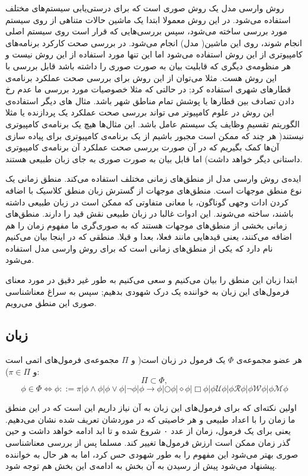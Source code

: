 روش وارسی مدل یک روش صوری است که برای درستی‌یابی سیستم‌های مختلف استفاده می‌شود. در این روش معمولا ابتدا یک ماشین حالات متناهی از روی سیستم مورد بررسی ساخته می‌شود، سپس بررسی‌هایی که قرار است روی سیستم اصلی انجام شوند، روی این ماشین( مدل) انجام می‌شود. در بررسی صحت کارکرد برنامه‌های کامپیوتری از این روش استفاده می‌شود اما این تنها مورد استفاده از این روش نیست و هر منظومه‌ی دیگری که قابلیت بیان به صورت صوری را داشته باشد قابل بررسی با این روش هست. مثلا می‌توان از این روش برای بررسی صحت عملکرد برنامه‌ی قطارهای شهری استفاده کرد; در حالتی که مثلا خصوصیات مورد بررسی ما عدم رخ دادن تصادف بین قطارها یا پوشش تمام  مناطق شهر باشد. مثال های دیگر استفاده‌ی این روش در علوم کامپیوتر می تواند بررسی صحت عملکرد یک پردازنده یا مثلا الگوریتم تقسیمِ وظایف یک سیستم عامل باشد. این مثال‌ها هیچ یک برنامه‌ی کامپیوتری نیستند( هر چند که ممکن است مجبور باشیم از یک برنامه‌ی کامپیوتری برای پیاده سازی آن‌ها کمک بگیریم که در آن صورت بررسی صحت عملکرد آن برنامه‌ی کامپیوتری داستانی دیگر خواهد داشت) اما قابل بیان به صورت صوری به جای زبان طبیعی هستند.

ایده‌ی روش وارسی مدل از منطق‌های زمانی مختلف استفاده می‌کند. منطق زمانی یک نوع منطق موجهات است. منطق‌های موجهات از گسترش زبان منطق کلاسیک با اضافه کردن ادات وجهی گوناگون، با معانی متفاوتی که ممکن است در زبان طبیعی داشته باشند، ساخته می‌شوند. این ادوات غالبا در زبان طبیعی نقش قید را دارند. منطق‌های زمانی بخشی از منطق‌های موجهات هستند که به صوری‌گری ما مفهوم زمان را هم اضافه می‌کنند، یعنی قیدهایی مانند فعلا، بعدا و قبلا. منطقی که در اینجا بیان می‌کنیم  نام دارد که یکی از منطق‌های زمانی است که برای روش وارسی مدل استفاده می‌شود.

ابتدا زبان این منطق را بیان می‌کنیم و سعی می‌کنیم به طور غیر دقیق در مورد معنای فرمول‌های این زبان به خواننده یک درک شهودی بدهیم; سپس به سراغ معناشناسی صوری این منطق می‌رویم.

\subsection{زبان }
\begin{defn}
	هر عضو مجموعه‌ی $\Phi$ یک فرمول در زبان  است( و $\Pi$ مجموعه‌ی فرمول‌های اتمی است و $\pi \in \Pi$):
	$$
	\Pi \subset \Phi,
	$$
	$$
	\phi \in \Phi \Leftrightarrow
	\phi ::= \pi | \phi \land \phi | \phi \lor \phi |
	\neg \phi | \phi \rightarrow \phi  |
	\bigcirc \phi | \diamond \phi | \Box \phi |
	\phi \mathcal{U}\phi | \phi \mathcal{R}\phi | \phi \mathcal{W} \phi | \phi \mathcal{M} \phi
$$	
	
\end{defn}
اولین نکته‌ای که برای فرمول‌های این زبان به آن نیاز داریم این است که در این منطق ما زمان را با اعداد طبیعی و هر خاصیتی که در موردشان تعریف شده نشان می‌دهیم. یعنی برای یک فرمول، زمان از عدد ۰ شروع شده و تا ابد ادامه خواهد داشت و حین گذر زمان ممکن است ارزش فرمول‌ها تغییر کند. مسلما پس از بررسی معناشناسی صوری بهتر می‌شود این مفهوم را به طور شهودی حس کرد، اما به هر حال به خواننده پیشنهاد می‌شود پیش از رسیدن به آن بخش به ادامه‌ی این بخش هم توجه شود. 

